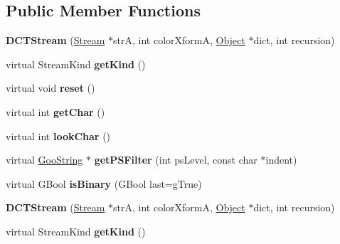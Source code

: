 \subsection*{Public Member Functions}
\begin{DoxyCompactItemize}
\item 
\mbox{\label{class_d_c_t_stream_aec14bb5e6189d35d65ffe06a5f34e981}} 
{\bfseries D\+C\+T\+Stream} (\hyperlink{class_stream}{Stream} $\ast$strA, int color\+XformA, \hyperlink{class_object}{Object} $\ast$dict, int recursion)
\item 
\mbox{\label{class_d_c_t_stream_abbb39da578adb27a1936bfe0ebefdc54}} 
virtual Stream\+Kind {\bfseries get\+Kind} ()
\item 
\mbox{\label{class_d_c_t_stream_a12fd5a6d7d76f563c972803d79014153}} 
virtual void {\bfseries reset} ()
\item 
\mbox{\label{class_d_c_t_stream_ad2a3d0dfbc121487bdcfc4f162a8671f}} 
virtual int {\bfseries get\+Char} ()
\item 
\mbox{\label{class_d_c_t_stream_ac93573ac89aedf05da4dbe7c5181c860}} 
virtual int {\bfseries look\+Char} ()
\item 
\mbox{\label{class_d_c_t_stream_a1268c326f6c40b40068f9ce08b2b804d}} 
virtual \hyperlink{class_goo_string}{Goo\+String} $\ast$ {\bfseries get\+P\+S\+Filter} (int ps\+Level, const char $\ast$indent)
\item 
\mbox{\label{class_d_c_t_stream_a7ccddc8159129cb0dc49749228190053}} 
virtual G\+Bool {\bfseries is\+Binary} (G\+Bool last=g\+True)
\item 
\mbox{\label{class_d_c_t_stream_aec14bb5e6189d35d65ffe06a5f34e981}} 
{\bfseries D\+C\+T\+Stream} (\hyperlink{class_stream}{Stream} $\ast$strA, int color\+XformA, \hyperlink{class_object}{Object} $\ast$dict, int recursion)
\item 
\mbox{\label{class_d_c_t_stream_abbb39da578adb27a1936bfe0ebefdc54}} 
virtual Stream\+Kind {\bfseries get\+Kind} ()

\end{DoxyCompactItemize}
